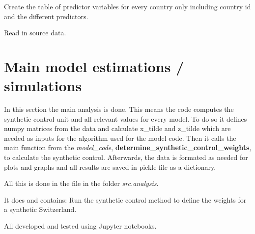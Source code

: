 \documentclass[a4paper,11pt,english]{sphinxmanual}
\begin{document}

\begin{fulllineitems}
\label{data_management:src.data_management.clean_raw_data.create_table_of_predictors}
Create the table of predictor variables for every country only including
country id and the different predictors.

\end{fulllineitems}


\begin{fulllineitems}
\label{data_management:src.data_management.clean_raw_data.read_in_data}
Read in source data.

\end{fulllineitems}



\chapter{Main model estimations / simulations}
\label{analysis:main-model-estimations-simulations}\label{analysis:analysis}\label{analysis::doc}
In this section the main analysis is done. This means the code computes the synthetic control unit and all relevant values for every model.
To do so it defines numpy matrices from the data and calculate x\_tilde and z\_tilde which are needed as inputs for the algorithm used for the model code.
Then it calls the main function from the \emph{model\_code}, \textbf{determine\_synthetic\_control\_weights}, to calculate the synthetic control. Afterwards, the data is formated as needed
for plots and graphs and all results are saved in pickle file as a dictionary.

All this is done in the file  in the folder \emph{src.analysis}.

It does and contains:
\label{analysis:module-src.analysis.synthetic_control}
Run the synthetic control method to define the weights for a synthetic
Switzerland.

All developed and tested using Jupyter notebooks.
\end{document}

